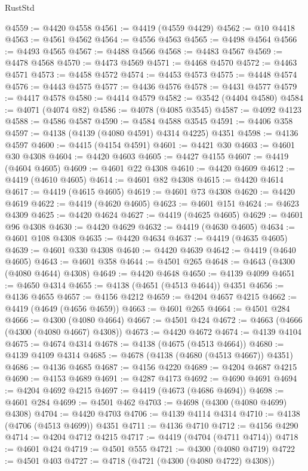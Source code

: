 \begin{lexlean}{RustStd}
\begin{coremodule}
@4559 := @4420 @4558
@4561 := @4419 (@4559 @4429)
@4562 := @10 @4418
@4563 := @4561 @4562
@4564 := @4556 @4563
@4565 := @4498 @4564
@4566 := @4493 @4565
@4567 := @4488 @4566
@4568 := @4483 @4567
@4569 := @4478 @4568
@4570 := @4473 @4569
@4571 := @4468 @4570
@4572 := @4463 @4571
@4573 := @4458 @4572
@4574 := @4453 @4573
@4575 := @4448 @4574
@4576 := @4443 @4575
@4577 := @4436 @4576
@4578 := @4431 @4577
@4579 := @4417 @4578
@4580 := @4414 @4579
@4582 := @3542 (@4404 @4580)
@4584 := @4071 (@4074 @82)
@4586 := @4078 (@4085 @3545)
@4587 := @4092 @4123
@4588 := @4586 @4587
@4590 := @4584 @4588 @3545
@4591 := @4406 @358
@4597 := @4138 (@4139 (@4080 @4591) @4314 @4225) @4351
@4598 := @4136 @4597
@4600 := @4415 (@4154 @4591)
@4601 := @4421 @30
@4603 := @4601 @30 @4308
@4604 := @4420 @4603
@4605 := @4427 @4155
@4607 := @4419 (@4604 @4605)
@4609 := @4601 @22 @4308
@4610 := @4420 @4609
@4612 := @4419 (@4610 @4605)
@4614 := @4601 @82 @4308
@4615 := @4420 @4614
@4617 := @4419 (@4615 @4605)
@4619 := @4601 @73 @4308
@4620 := @4420 @4619
@4622 := @4419 (@4620 @4605)
@4623 := @4601 @151
@4624 := @4623 @4309
@4625 := @4420 @4624
@4627 := @4419 (@4625 @4605)
@4629 := @4601 @96 @4308
@4630 := @4420 @4629
@4632 := @4419 (@4630 @4605)
@4634 := @4601 @108 @4308
@4635 := @4420 @4634
@4637 := @4419 (@4635 @4605)
@4639 := @4601 @330 @4308
@4640 := @4420 @4639
@4642 := @4419 (@4640 @4605)
@4643 := @4601 @358
@4644 := @4501 @265
@4648 := @4643 (@4300 (@4080 @4644) @4308)
@4649 := @4420 @4648
@4650 := @4139 @4099
@4651 := @4650 @4314
@4655 := @4138 (@4651 (@4513 @4644)) @4351
@4656 := @4136 @4655
@4657 := @4156 @4212
@4659 := @4204 @4657 @4215
@4662 := @4419 (@4649 (@4656 @4659))
@4663 := @4601 @265
@4664 := @4501 @284
@4666 := @4300 (@4080 @4664)
@4667 := @4501 @424
@4672 := @4663 (@4666 (@4300 (@4080 @4667) @4308))
@4673 := @4420 @4672
@4674 := @4139 @4104
@4675 := @4674 @4314
@4678 := @4138 (@4675 (@4513 @4664))
@4680 := @4139 @4109 @4314
@4685 := @4678 (@4138 (@4680 (@4513 @4667)) @4351)
@4686 := @4136 @4685
@4687 := @4156 @4220
@4689 := @4204 @4687 @4215
@4690 := @4153 @4689
@4691 := @4287 @4173
@4692 := @4690 @4691
@4694 := @4204 @4692 @4215
@4697 := @4419 (@4673 (@4686 @4694))
@4698 := @4601 @284
@4699 := @4501 @462
@4703 := @4698 (@4300 (@4080 @4699) @4308)
@4704 := @4420 @4703
@4706 := @4139 @4114 @4314
@4710 := @4138 (@4706 (@4513 @4699)) @4351
@4711 := @4136 @4710
@4712 := @4156 @4290
@4714 := @4204 @4712 @4215
@4717 := @4419 (@4704 (@4711 @4714))
@4718 := @4601 @424
@4719 := @4501 @555
@4721 := @4300 (@4080 @4719)
@4722 := @4501 @403
@4727 := @4718 (@4721 (@4300 (@4080 @4722) @4308))

\end{coremodule}
\end{lexlean}
